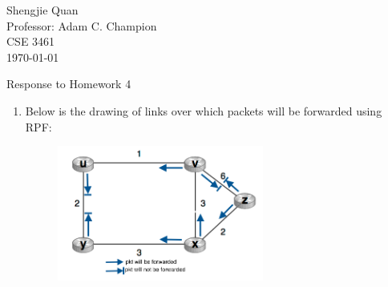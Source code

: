\documentclass[12pt]{article}
\title{}
\author{}
\date{}                                           %
\begin{document}
\begin{flushleft}
Shengjie Quan\\
Professor: Adam C. Champion\\
CSE 3461	 \\
\today \\
\end{flushleft}

\begin{center}
Response to Homework 4
\end{center}

\setlength{\parindent}{0.5in}

\begin{singlespace}

\begin{enumerate}

\item Below is the drawing of links over which packets will be forwarded using RPF:
	\begin{figure}[h]
	\centering
	\includegraphics[width=0.64\textwidth]{1a} 
	\end{figure}


\end{enumerate}
\end{singlespace}
\end{document}
